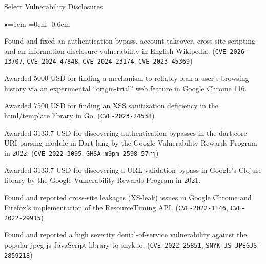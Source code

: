 \documentclass{resume} %
\begin{document}
\begin{rSection}{Select Vulnerability Disclosures}
\begin{list}{$\bullet$}{\leftmargin=1em \itemindent=0em}
\itemsep -0.6em
\item Found and fixed an authentication bypass, account-takeover, cross-site scripting and an information disclosure vulnerability in English Wikipedia. (\texttt{CVE-2026-13707}, \texttt{CVE-2024-47848}, \texttt{CVE-2024-23174}, \texttt{CVE-2023-45369})
\item Awarded 5000 USD for finding a mechanism to reliably leak a user's browsing history via an experimental ``origin-trial'' web feature in Google Chrome 116.
\item Awarded 7500 USD for finding an XSS sanitization deficiency in the html/template library in Go. (\texttt{CVE-2023-24538})
\item Awarded 3133.7 USD for discovering authentication bypasses in the dart:core URI parsing module in Dart-lang by the Google Vulnerability Rewards Program in 2022. (\texttt{CVE-2022-3095}, \texttt{GHSA-m9pm-2598-57rj})
\item Awarded 3133.7 USD for discovering a URL validation bypass in Google's Clojure library by the Google Vulnerability Rewards Program in 2021.
\item Found and reported cross-site leakages (XS-leak) issues in Google Chrome and Firefox's implementation of the ResourceTiming API. (\texttt{CVE-2022-1146}, \texttt{CVE-2022-29915})
\item Found and reported a high severity denial-of-service vulnerability against the popular jpeg-js JavaScript library to snyk.io.
\linebreak(\texttt{CVE-2022-25851}, \texttt{SNYK-JS-JPEGJS-2859218})
\end{list}
\end{rSection}
\end{document}
